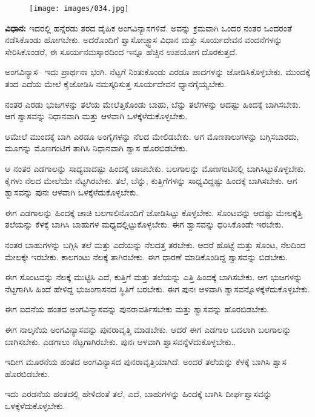 \begin{figure}
\texttt{[image: images/034.jpg]}
\end{figure}

\textbf{ವಿಧಾನ:} ಇದರಲ್ಲಿ ಹನ್ನೆರಡು ತರದ ದೈಹಿಕ ಅಂಗವಿನ್ಯಾಸಗಳಿವೆ. ಅವನ್ನು ಕ್ರಮವಾಗಿ ಒಂದರ ನಂತರ ಒಂದರಂತೆ ನಡೆಸಿಕೊಂಡು ಹೋಗಬೇಕು. ಅದರೊಂದಿಗೆ ಶ್ವಾಸೋಚ್ಛ್ವಾಸ ವಿಧಾನ ಮತ್ತು ಸೂರ್ಯದೇವನ ವಂದನೆಗಳನ್ನು ಸೇರಿಸಿಕೊಂಡರೆ, ಈ ಸೂರ್ಯನಮಸ್ಕಾರದಿಂದ ಇನ್ನೂ ಹೆಚ್ಚಿನ ಉಪಯೋಗ ದೊರಕುತ್ತದೆ.

ಅಂಗವಿನ್ಯಾಸ–  ಇದು ಪ್ರಾರ್ಥನಾ ಭಂಗಿ. ನೆಟ್ಟಗೆ ನಿಂತುಕೊಂಡು ಎರಡೂ ಪಾದಗಳನ್ನು ಜೋಡಿಸಿಕೊಳ್ಳಬೇಕು. ಮುಂದಕ್ಕೆ ತಂದ ಎದೆಯ ಮೇಲೆ ಕೈಜೋಡಿಸಿ ನಮಸ್ಕರಿಸುತ್ತ ಸೂರ್ಯದೇವನ ಧ್ಯಾನಗೈಯ್ಯಬೇಕು.

 ನಂತರ ಎರಡು ಭುಜಗಳನ್ನು ತಲೆಯ ಮೇಲೆತ್ತಿಕೊಂಡು ಬಾಹು, ಬೆನ್ನು ತಲೆಗಳನ್ನು ಆದಷ್ಟು ಹಿಂದಕ್ಕೆ ಬಾಗಿಸಬೇಕು. ಆಗ ಶ್ವಾಸವನ್ನು ನಿಧಾನವಾಗಿ ಮತ್ತು ಆಳವಾಗಿ ಒಳಕ್ಕೆಳೆದುಕೊಳ್ಳಬೇಕು.

 ಆಮೇಲೆ ಮುಂದಕ್ಕೆ ಬಾಗಿ ಎರಡೂ ಅಂಗೈಗಳನ್ನು ನೆಲದ ಮೇಲಿಡಬೇಕು. ಆಗ ಮೊಣಕಾಲುಗಳನ್ನು ಬಗ್ಗಿಸಬಾರದು, ಮೂಗನ್ನು ಮೊಣಗಂಟಿಗೆ ತಾಗಿಸಿ ನಿಧಾನವಾಗಿ ಶ್ವಾಸ ಹೊರಬಿಡಬೇಕು.

 ಆ ನಂತರ ಎಡಗಾಲನ್ನು ಸಾಧ್ಯವಾದಷ್ಟು ಹಿಂದಕ್ಕೆ ಚಾಚಬೇಕು. ಬಲಗಾಲನ್ನು ಮೊಣಗಂಟಿನಲ್ಲಿ ಬಾಗಿಸಿಟ್ಟುಕೊಳ್ಳಬೇಕು. ಕೈಗಳು ನೆಲದ ಮೇಲೆಯೇ ನೆಟ್ಟಗಿರಬೇಕು. ತಲೆ, ಬೆನ್ನು, ಕುತ್ತಿಗೆಗಳನ್ನು ಸಾಧ್ಯವಿದ್ದಷ್ಟು ಹಿಂದಕ್ಕೆ ಬಾಗಿಸಬೇಕು. ಆಗ ಶ್ವಾಸವನ್ನು ಪುನಃ ಆಳವಾಗಿ ಒಳಕ್ಕೆಳೆದುಕೊಳ್ಳಬೇಕು.

 ಈಗ ಎಡಗಾಲನ್ನು ಹಿಂದಕ್ಕೆ ಚಾಚಿ ಬಲಗಾಲಿನೊಂದಿಗೆ ಜೋಡಿಸಿಟ್ಟು ಕೊಳ್ಳಬೇಕು. ಸೊಂಟವನ್ನು ಆದಷ್ಟು ಮೇಲಕ್ಕೆತ್ತಿ ತಲೆಯನ್ನು ಕೆಳಕ್ಕೆ ಬಾಗಿಸಿ ಬಾಹುಗಳ ಮಧ್ಯದಲ್ಲಿಟ್ಟುಕೊಳ್ಳಬೇಕು. ಈಗ ಶ್ವಾಸವನ್ನು ಧರಿಸಿಕೊಂಡೇ ಇರಬೇಕು.

 ನಂತರ ಬಾಹುಗಳನ್ನು ಬಗ್ಗಿಸಿ ತಲೆ ಮತ್ತು ಎದೆಯನ್ನು ನೆಲದತ್ತ ತರಬೇಕು. ಆದರೆ ಹೊಟ್ಟೆ ಮತ್ತು ಸೊಂಟ, ನೆಲದಿಂದ ಮೇಲಕ್ಕೇ ಇರಬೇಕು. ಕಾಲಗಂಟು ನೆಲಕ್ಕೆ ತಾಗಿರಬೇಕು. ಈಗ ಧಾರಣೆ ಮಾಡಿಕೊಂಡಿದ್ದ ಶ್ವಾಸವನ್ನು ಬಿಡಬೇಕು.

 ಈಗ ಸೊಂಟವನ್ನು ನೆಲಕ್ಕೆ ಮುಟ್ಟಿಸಿ ಎದೆ, ಕುತ್ತಿಗೆ ಮತ್ತು ತಲೆಯನ್ನು ಎತ್ತಿ ಹಿಂದಕ್ಕೆ ಬಾಗಿಸಬೇಕು. ಆಗ ಭುಜಗಳನ್ನು ನೆಟ್ಟಗಾಗಿಸಿ ಹಿಂದೆ ಹೇಳಿದ್ದ ಭುಜಂಗಾಸನದ ಸ್ಥಿತಿಗೆ ಬರಬೇಕು. ಈಗ ಪುನಃ ಆಳವಾಗಿ ಶ್ವಾಸವನ್ನೊಳಕ್ಕೆಳೆದುಕೊಳ್ಳಬೇಕು.

 ಈಗ ಐದನೆಯ ಹಂತದ ಅಂಗವಿನ್ಯಾಸವನ್ನು ಪುನರಾವರ್ತಿಸಬೇಕು ಮತ್ತು ಶ್ವಾಸವನ್ನು ಹೊರಬಿಡಬೇಕು.

 ಈಗ ನಾಲ್ಕನೆಯ ಅಂಗವಿನ್ಯಾಸವನ್ನು ಪುನರಾವೃತ್ತಿ ಮಾಡಬೇಕು. ಆದರೆ ಈಗ ಎಡಗಾಲ ಬದಲಾಗಿ ಬಲಗಾಲನ್ನು ಬಾಗಿಸಬೇಕು. ಎಡಗಾಲು ನೆಟ್ಟಗಾಗಿರಬೇಕು. ಪುನಃ ಆಳವಾಗಿ ಶ್ವಾಸವನ್ನೆಳೆದುಕೊಳ್ಳಬೇಕು..

 ಇದೀಗ ಮೂರನೆಯ ಹಂತದ ಅಂಗವಿನ್ಯಾಸದ ಪುನರಾವೃತ್ತಿಯಾಗಿದೆ. ಅಂದರೆ ತಲೆಯನ್ನು ಕೆಳಕ್ಕೆ ಬಾಗಿಸಿ ಶ್ವಾಸ ಹೊರಬಿಡಬೇಕು.

 ಇದು ಎರಡನೆಯ ಹಂತದಲ್ಲಿ ಹೇಳಿದಂತೆ ತಲೆ, ಎದೆ, ಬಾಹುಗಳನ್ನು ಹಿಂದಕ್ಕೆ ಬಾಗಿಸಿ ದೀರ್ಘಶ್ವಾಸವನ್ನು ಒಳಕ್ಕೆಳೆದುಕೊಳ್ಳಬೇಕು.

